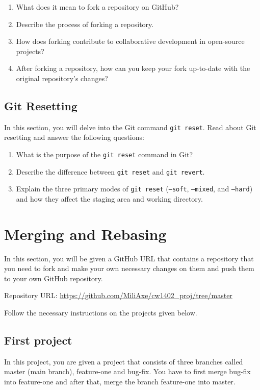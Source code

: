 \documentclass[titlepage]{article}
\begin{document}
\begin{enumerate}
    \item What does it mean to fork a repository on GitHub?
    \item Describe the process of forking a repository.
    \item How does forking contribute to collaborative development in open-source projects?
    \item After forking a repository, how can you keep your fork up-to-date with the original repository's changes?
\end{enumerate}

\subsection{Git Resetting}

In this section, you will delve into the Git command \texttt{git reset}. Read about Git resetting and answer the following questions:

\begin{enumerate}
    \item What is the purpose of the \texttt{git reset} command in Git?
    \item Describe the difference between \texttt{git reset} and \texttt{git revert}.
    \item Explain the three primary modes of \texttt{git reset} (\texttt{--soft}, \texttt{--mixed}, and \texttt{--hard})
        and how they affect the staging area and working directory.
\end{enumerate}

\pagebreak

\section{Merging and Rebasing}
In this section, you will be given a GitHub URL that contains a repository that you need to fork and
make your own necessary changes on them and push them to your own GitHub repository.

Repository URL: \url{https://github.com/MiliAxe/cw1402_proj/tree/master}

Follow the necessary instructions on the projects given below.


\subsection{First project}
In this project, you are given a project that consists of three branches called master (main branch), feature-one and bug-fix. You have to first merge bug-fix into feature-one and after that, merge the branch feature-one into master.
\end{document}
